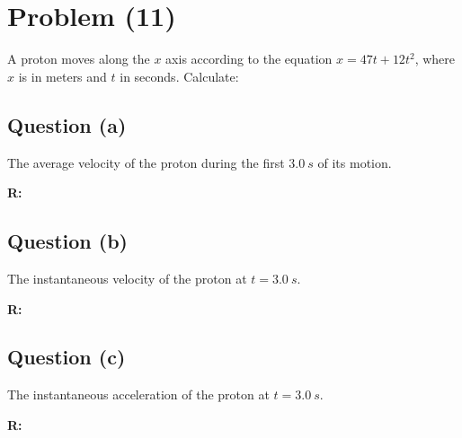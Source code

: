 \section{Problem (11)}
	A proton moves along the $x$ axis according to the equation $x = 47t + 12t^{2}$, where $x$ is in meters and $t$ in seconds. Calculate:

	\subsection{Question (a)}
		The average velocity of the proton during the first $3.0 \ s$ of its motion.

		\textbf{R:} \newline

	\subsection{Question (b)}
		The instantaneous velocity of the proton at $t = 3.0 \ s$.

		\textbf{R:} \newline

	\subsection{Question (c)}
		The instantaneous acceleration of the proton at $t = 3.0 \ s$.

		\textbf{R:} \newline
